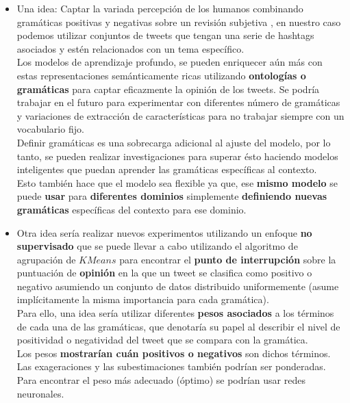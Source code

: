 \documentclass[a4paper,12pt]{report}
\begin{document}
\begin{itemize}

\item Una idea: Captar la variada percepción de los humanos combinando gramáticas positivas y negativas sobre un
revisión subjetiva \cite{Bhuvan}, en nuestro caso podemos utilizar conjuntos de tweets que tengan una serie de hashtags asociados y estén relacionados con un tema específico. 
\vspace{2mm}\\
Los modelos de aprendizaje profundo, se pueden enriquecer aún más con estas representaciones semánticamente ricas utilizando \textbf{ontologías o gramáticas} para captar eficazmente la opinión de los tweets. Se podría trabajar en el futuro para experimentar con diferentes número de gramáticas y variaciones de extracción de características para no trabajar siempre con un vocabulario fijo.
\vspace{2mm}\\
Definir gramáticas es una sobrecarga adicional al ajuste del modelo, por lo tanto, se pueden realizar investigaciones para superar ésto haciendo modelos inteligentes que puedan aprender las gramáticas específicas al contexto.
\vspace{2mm}\\
Esto también hace que el modelo sea flexible ya que, ese \textbf{mismo modelo} se puede \textbf{usar} para \textbf{diferentes dominios} simplemente \textbf{definiendo nuevas gramáticas} específicas del contexto para ese dominio.

\item Otra idea sería realizar nuevos experimentos utilizando un enfoque \textbf{no supervisado} que se puede llevar a cabo utilizando el algoritmo de agrupación de $KMeans$ para encontrar el \textbf{punto de interrupción} sobre la puntuación de \textbf{opinión} en la que un tweet se clasifica como positivo o
negativo asumiendo un conjunto de datos distribuido uniformemente (asume implícitamente la misma importancia para cada gramática).
\vspace{2mm}\\
Para ello, una idea sería utilizar diferentes \textbf{pesos asociados} a los términos de cada una de las gramáticas, que denotaría su papel al describir el nivel de positividad o negatividad del tweet que se compara con la gramática. 
\vspace{2mm}\\
Los pesos \textbf{mostrarían cuán positivos o negativos} son dichos términos. Las exageraciones y las subestimaciones también podrían ser ponderadas. Para encontrar el peso más adecuado (óptimo) se podrían usar redes neuronales.

\end{itemize}
\end{document}
